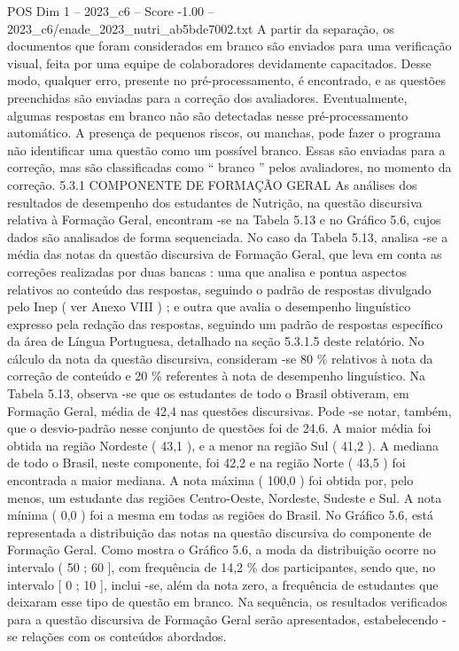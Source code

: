 \begin{textsample}{POS Dim 1 – 2023\_c6 – Score -1.00 – 2023\_c6/enade\_2023\_nutri\_ab5bde7002.txt}
A partir da separação, os documentos que foram considerados em branco são enviados para uma verificação visual, feita por uma equipe de colaboradores devidamente capacitados.
Desse modo, qualquer erro, presente no pré-processamento, é encontrado, e as questões preenchidas são enviadas para a correção dos avaliadores.
Eventualmente, algumas respostas em branco não são detectadas nesse pré-processamento automático.
A presença de pequenos riscos, ou manchas, pode fazer o programa não identificar uma questão como um possível branco.
Essas são enviadas para a correção, mas são classificadas como “ branco ” pelos avaliadores, no momento da correção. 5.3.1 COMPONENTE DE FORMAÇÃO GERAL As análises dos resultados de desempenho dos estudantes de Nutrição, na questão discursiva relativa à Formação Geral, encontram -se na Tabela 5.13 e no Gráfico 5.6, cujos dados são analisados de forma sequenciada.
No caso da Tabela 5.13, analisa -se a média das notas da questão discursiva de Formação Geral, que leva em conta as correções realizadas por duas bancas : uma que analisa e pontua aspectos relativos ao conteúdo das respostas, seguindo o padrão de respostas divulgado pelo Inep ( ver Anexo VIII ) ; e outra que avalia o desempenho linguístico expresso pela redação das respostas, seguindo um padrão de respostas específico da área de Língua Portuguesa, detalhado na seção 5.3.1.5 deste relatório.
No cálculo da nota da questão discursiva, consideram -se 80 \% relativos à nota da correção de conteúdo e 20 \% referentes à nota de desempenho linguístico.
Na Tabela 5.13, observa -se que os estudantes de todo o Brasil obtiveram, em Formação Geral, média de 42,4 nas questões discursivas.
Pode -se notar, também, que o desvio-padrão nesse conjunto de questões foi de 24,6.
A maior média foi obtida na região Nordeste ( 43,1 ), e a menor na região Sul ( 41,2 ).
A mediana de todo o Brasil, neste componente, foi 42,2 e na região Norte ( 43,5 ) foi encontrada a maior mediana.
A nota máxima ( 100,0 ) foi obtida por, pelo menos, um estudante das regiões Centro-Oeste, Nordeste, Sudeste e Sul.
A nota mínima ( 0,0 ) foi a mesma em todas as regiões do Brasil.
No Gráfico 5.6, está representada a distribuição das notas na questão discursiva do componente de Formação Geral.
Como mostra o Gráfico 5.6, a moda da distribuição ocorre no intervalo ( 50 ; 60 ], com frequência de 14,2 \% dos participantes, sendo que, no intervalo [ 0 ; 10 ], inclui -se, além da nota zero, a frequência de estudantes que deixaram esse tipo de questão em branco.
Na sequência, os resultados verificados para a questão discursiva de Formação Geral serão apresentados, estabelecendo -se relações com os conteúdos abordados.

\end{textsample}
